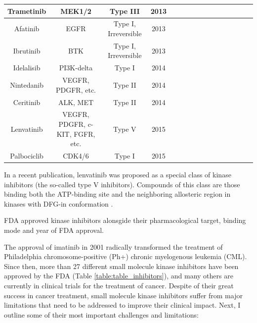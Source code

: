 \documentclass[11pt, b5paper,twoside]{tesi_upf}
\renewcommand{\footnotesize}{\small}
\begin{document}
\begin{adjustbox}{max width=\textwidth}
\begin{threeparttable}[htbp]
\begin{tabular}{*{4}{|| c | c  |  c | c  ||}}
 \hline
 Trametinib & MEK1/2 &  Type III   & 2013  \\ 
  \hline
 Afatinib & EGFR &  Type I, Irreversible  & 2013  \\ 
  \hline
 Ibrutinib & BTK &  Type I, Irreversible  & 2013  \\
  \hline
 Idelalisib & PI3K-delta &  Type I   & 2014  \\
  \hline
 Nintedanib & VEGFR, PDGFR, etc.&  Type II   & 2014  \\
 \hline 
 Ceritinib  &   ALK, MET &  Type II  & 2014 \\
 \hline 
 Lenvatinib  &   VEGFR, PDGFR, c-KIT, FGFR, etc. &  Type V \tnote{\textdagger}  & 2015 \\
 \hline 
 Palbociclib  &   CDK4/6 &  Type I  & 2015 \\
 \hline
 
 \end{tabular} 
 
  \begin{tablenotes}
  
  \footnotesize
\item[\textdagger] In a recent publication, lenvatinib was proposed as a special class of kinase inhibitors (the so-called type V inhibitors). Compounds of this class are those binding both the ATP-binding site and the neighboring allosteric region in kinases with DFG-in conformation \cite{Okamoto2015}. 
\end{tablenotes}



\caption{FDA approved kinase inhibitors alonsgide their pharmacological target, binding mode and year of FDA approval.}
\label{table:table_inhibitors} 

 \end{threeparttable}
\end{adjustbox} 
 
\par The approval of imatinib in 2001 radically transformed the treatment of Philadelphia chromosome-positive (Ph+) chronic myelogenous leukemia (CML). Since then, more than 27 different small molecule kinase inhibitors have been approved by the FDA (Table \ref{table:table_inhibitors}), and many others are currently in clinical trials for the treatment of cancer. Despite of their great success in cancer treatment, small molecule kinase inhibitors suffer from major limitations that need to be addressed to improve their clinical impact. Next, I outline some of their most important challenges and limitations:  
\end{document}
